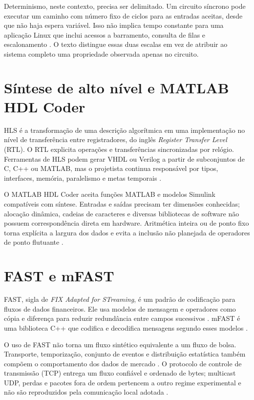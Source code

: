 Determinismo, neste contexto, precisa ser delimitado. Um circuito síncrono pode executar um caminho com número fixo de ciclos para as entradas aceitas, desde que não haja espera variável. Isso não implica tempo constante para uma aplicação Linux que inclui acessos a barramento, consulta de filas e escalonamento \cite{HarrisHarris2013,PattersonHennessy2017}. O texto distingue essas duas escalas em vez de atribuir ao sistema completo uma propriedade observada apenas no circuito.

\section{Síntese de alto nível e MATLAB HDL Coder}\label{sec:hls}

HLS é a transformação de uma descrição algorítmica em uma implementação no nível de transferência entre registradores, do inglês \textit{Register Transfer Level} (RTL). O RTL explicita operações e transferências sincronizadas por relógio. Ferramentas de HLS podem gerar VHDL ou Verilog a partir de subconjuntos de C, C++ ou MATLAB, mas o projetista continua responsável por tipos, interfaces, memória, paralelismo e metas temporais \cite{MathWorksHDLCoder}.

O MATLAB HDL Coder aceita funções MATLAB e modelos Simulink compatíveis com síntese. Entradas e saídas precisam ter dimensões conhecidas; alocação dinâmica, cadeias de caracteres e diversas bibliotecas de software não possuem correspondência direta em hardware. Aritmética inteira ou de ponto fixo torna explícita a largura dos dados e evita a inclusão não planejada de operadores de ponto flutuante \cite{MathWorksHDLCoder,MathWorksFixedPoint}.

\section{FAST e mFAST}\label{sec:fast}

FAST, sigla de \textit{FIX Adapted for STreaming}, é um padrão de codificação para fluxos de dados financeiros. Ele usa modelos de mensagem e operadores como cópia e diferença para reduzir redundância entre campos sucessivos \cite{FIXFAST}. mFAST é uma biblioteca C++ que codifica e decodifica mensagens segundo esses modelos \cite{mFAST}.

O uso de FAST não torna um fluxo sintético equivalente a um fluxo de bolsa. Transporte, temporização, conjunto de eventos e distribuição estatística também compõem o comportamento dos dados de mercado \cite{Gould2013,Cont2010}. O protocolo de controle de transmissão (TCP) entrega um fluxo confiável e ordenado de bytes; multicast UDP, perdas e pacotes fora de ordem pertencem a outro regime experimental e não são reproduzidos pela comunicação local adotada \cite{RFC9293}.

